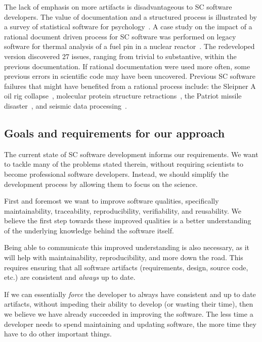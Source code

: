 \documentclass[preprint, 10pt]{sigplanconf}
\begin{document}
The lack of emphasis on more artifacts is disadvantageous to SC software
developers. The value of documentation and a structured process is illustrated
by a survey of statistical software for
psychology~\cite{SmithEtAl2015-SS-TR,SmithEtAl2015SQJ}. A case study on the
impact of a rational document driven process for SC software was performed on
legacy software for thermal analysis of a fuel pin in a nuclear
reactor~\cite{SmithAndKoothoor2016, SmithEtAl2013}. The redeveloped version
discovered 27 issues, ranging from trivial to substantive, within the previous
documentation. If rational documentation were used more often, some previous
errors in scientific code may have been uncovered. Previous SC software failures
that might have benefited from a rational process include: the Sleipner A oil
rig collapse~\cite[p.~38]{OliveiraAndStewart2006}, molecular protein structure
retractions~\cite{Miller2006}, the Patriot missile
disaster~\cite[p.~36]{OliveiraAndStewart2006}, and seismic data
processing~\cite{HattonAndRoberts1994}.

\subsection{Goals and requirements for our approach}

The current state of SC software development informs our requirements. We want
to tackle many of the problems stated therein, without requiring scientists to
become professional software developers. Instead, we should simplify the
development process by allowing them to focus on the science.

First and foremost we want to improve software qualities, specifically
maintainability, traceability, reproducibility, verifiability, and reusability.
We believe the first step towards these improved qualities is a better
understanding of the underlying knowledge behind the software itself.

Being able to communicate this improved understanding is also necessary, as it
will help with maintainability, reproducibility, and more down the road.  This
requires ensuring that all software artifacts (requirements, design,
source code, etc.) are consistent and \emph{always} up to date.

If we can essentially \emph{force} the developer to always have consistent and up
to date artifacts, without impeding their ability to develop (or wasting their
time), then we believe we have already succeeded in improving the software. The
less time a developer needs to spend maintaining and updating software, the
more time they have to do other important things. 
\end{document}
